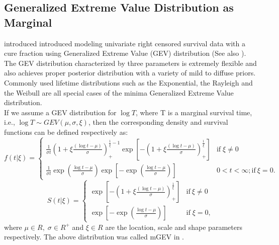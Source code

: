\documentclass[11pt]{article}
\theoremstyle{remboldstyle}
\begin{document}
\subsection{Generalized Extreme Value Distribution as Marginal}
\noindent
\cite{roy:roy:dey:2013} introduced introduced modeling univariate right censored survival data with a cure fraction using Generalized Extreme Value (GEV) distribution (See also \cite{roy:dey:2014}). The GEV distribution characterized by three parameters is extremely flexible and also achieves proper posterior distribution with a variety of mild to diffuse priors. Commonly used lifetime distributions such as the Exponential, the Rayleigh and the Weibull are all special cases of the minima Generalized Extreme Value distribution.\\
If we assume a GEV distribution for $\log T$, where T is a marginal survival time, i.e., $\log T \sim GEV (\mu,\sigma,\xi)$, then the corresponding density and survival functions can be defined respectively as:\\
\[
f(t|\xi)=\begin{cases}
\frac{1}{\sigma t}(1+\xi\frac{(\log t - \mu)}{\sigma})_{+}^{\frac{1}{\xi}-1}\exp[-(1+\xi\frac{(\log t - \mu)}{\sigma})_{+}^{\frac{1}{\xi}}] & \mbox{if} \; \xi  \neq 0\\
\frac{1}{\sigma t}\exp(\frac{\log t - \mu}{\sigma})\exp[-\exp(\frac{\log t - \mu}{\sigma})] & 0<t<\infty; \mbox{if}\ \xi=0.
\end{cases}
\]
\[
S(t|\xi)=\begin{cases}
\exp[-(1+\xi\frac{(\log t - \mu)}{\sigma})_{+}^{\frac{1}{\xi}}]  & \mbox{if}\ \xi\neq0\\
\exp[-\exp(\frac{\log t - \mu}{\sigma})] & \mbox{if} \; \xi=0,
\end{cases}
\]
where $\mu\in R,\; \sigma\in R^+$ and $\xi\in R$ are the location, scale and shape parameters respectively. The above distribution was called mGEV in \cite{roy:roy:dey:2013}.
\end{document}
